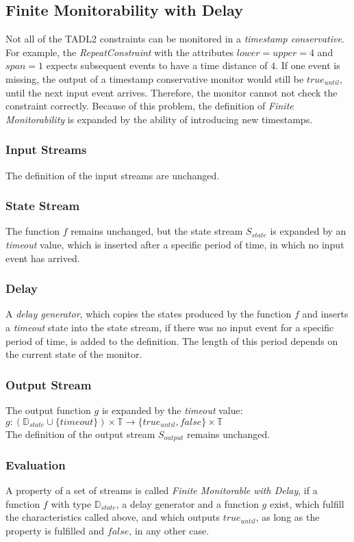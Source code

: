 	\subsection{Finite Monitorability with Delay}
		Not all of the TADL2 constraints can be monitored in a \emph{timestamp conservative}. For example, the \emph{RepeatConstraint} with the attributes $lower=upper=4$ and $span=1$ expects subsequent events to have a time distance of $4$. If one event is missing, the output of a timestamp conservative monitor would still be $true_{until}$, until the next input event arrives. Therefore, the monitor cannot not check the constraint correctly. Because of this problem, the definition of \emph{Finite Monitorability} is expanded by the ability of introducing new timestamps.
		\subsubsection{Input Streams}
			The definition of the input streams are unchanged.
		\subsubsection{State Stream}
			The function $f$ remains unchanged, but the state stream $S_{state}$ is expanded by an \emph{timeout} value, which is inserted after a specific period of time, in which no input event has arrived.
		\subsubsection{Delay}
			A \emph{delay generator}, which copies the states produced by the function $f$ and inserts a \emph{timeout} state into the state stream, if there was no input event for a specific period of time, is added to the definition. The length of this period depends on the current state of the monitor.
		\subsubsection{Output Stream}
			The output function $g$ is expanded by the \emph{timeout} value:\\
			$g: (\mathbb{D}_{state}\cup\{timeout\})\times \mathbb{T}\rightarrow \{true_{until}, false\}\times \mathbb{T}$\\
			The definition of the output stream $S_{output}$ remains unchanged.
		\subsubsection{Evaluation}
			A property of a set of streams is called \emph{Finite Monitorable with Delay}, if a function $f$ with type $\mathbb{D}_{state}$, a delay generator and a function $g$ exist, which fulfill the characteristics called above, and which outputs $true_{until}$, as long as the property is fulfilled and $false$, in any other case.
			
